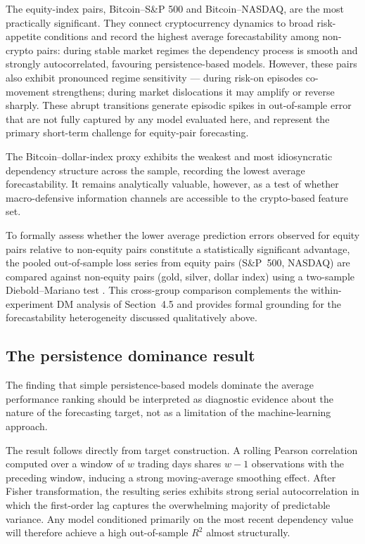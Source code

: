The equity-index pairs, Bitcoin--S\&P 500 and Bitcoin--NASDAQ, are the most practically significant. They connect cryptocurrency dynamics to broad risk-appetite conditions and record the highest average forecastability among non-crypto pairs: during stable market regimes the dependency process is smooth and strongly autocorrelated, favouring persistence-based models. However, these pairs also exhibit pronounced regime sensitivity --- during risk-on episodes co-movement strengthens; during market dislocations it may amplify or reverse sharply. These abrupt transitions generate episodic spikes in out-of-sample error that are not fully captured by any model evaluated here, and represent the primary short-term challenge for equity-pair forecasting.

The Bitcoin--dollar-index proxy exhibits the weakest and most idiosyncratic dependency structure across the sample, recording the lowest average forecastability. It remains analytically valuable, however, as a test of whether macro-defensive information channels are accessible to the crypto-based feature set.

To formally assess whether the lower average prediction errors observed for equity pairs relative to non-equity pairs constitute a statistically significant advantage, the pooled out-of-sample loss series from equity pairs (S\&P~500, NASDAQ) are compared against non-equity pairs (gold, silver, dollar index) using a two-sample Diebold--Mariano test \cite{diebold1995}. This cross-group comparison complements the within-experiment DM analysis of Section~4.5 and provides formal grounding for the forecastability heterogeneity discussed qualitatively above.

\subsection{The persistence dominance result}

The finding that simple persistence-based models dominate the average performance ranking should be interpreted as diagnostic evidence about the nature of the forecasting target, not as a limitation of the machine-learning approach.

The result follows directly from target construction. A rolling Pearson correlation computed over a window of $w$ trading days shares $w-1$ observations with the preceding window, inducing a strong moving-average smoothing effect. After Fisher transformation, the resulting series exhibits strong serial autocorrelation in which the first-order lag captures the overwhelming majority of predictable variance. Any model conditioned primarily on the most recent dependency value will therefore achieve a high out-of-sample $R^2$ almost structurally.

